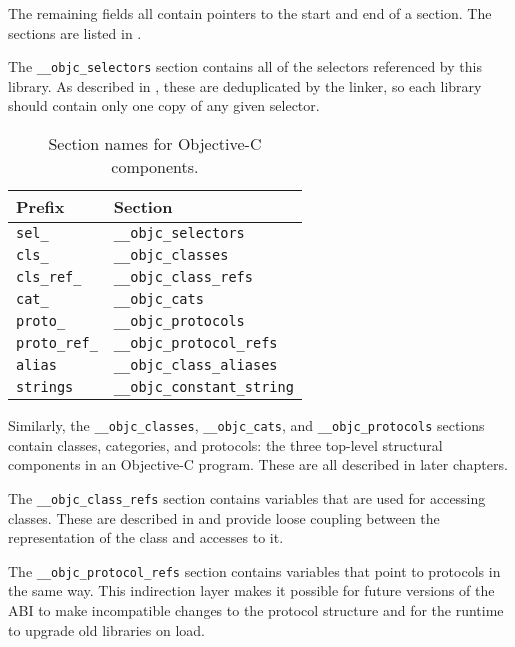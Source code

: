\documentclass[a4paper]{report}
\newcommand{\ccode}[1]{\lstinline[language={C}]{#1}}
\newcommand{\inccode}[4]{
{
	 }}
	]{../#1}
}
}
\begin{document}
The remaining fields all contain pointers to the start and end of a section.
The sections are listed in .

\inccode{loader.c}{initobjc}{objc_init}{The Objective-C library description structure.}

The \ccode{__objc_selectors} section contains all of the selectors referenced by this library.
As described in , these are deduplicated by the linker, so each library should contain only one copy of any given selector.

\begin{table}
	\begin{center}
		\begin{tabular}{l|l}
			Prefix & Section \\\hline
			\ccode{sel_} & \ccode{__objc_selectors}\\
			\ccode{cls_} & \ccode{__objc_classes}\\
			\ccode{cls_ref_} & \ccode{__objc_class_refs}\\
			\ccode{cat_} & \ccode{__objc_cats}\\
			\ccode{proto_} & \ccode{__objc_protocols}\\
			\ccode{proto_ref_} & \ccode{__objc_protocol_refs}\\
			\ccode{alias} & \ccode{__objc_class_aliases}\\
			\ccode{strings} & \ccode{__objc_constant_string}
		\end{tabular}
		\caption{\label{tab:sections}Section names for Objective-C components.}
	\end{center}
\end{table}

Similarly, the \ccode{__objc_classes}, \ccode{__objc_cats}, and \ccode{__objc_protocols} sections contain classes, categories, and protocols: the three top-level structural components in an Objective-C program.
These are all described in later chapters.

The \ccode{__objc_class_refs} section contains variables that are used for accessing classes.
These are described in  and provide loose coupling between the representation of the class and accesses to it.

The \ccode{__objc_protocol_refs} section contains variables that point to protocols in the same way.
This indirection layer makes it possible for future versions of the ABI to make incompatible changes to the protocol structure and for the runtime to upgrade old libraries on load.
\end{document}

